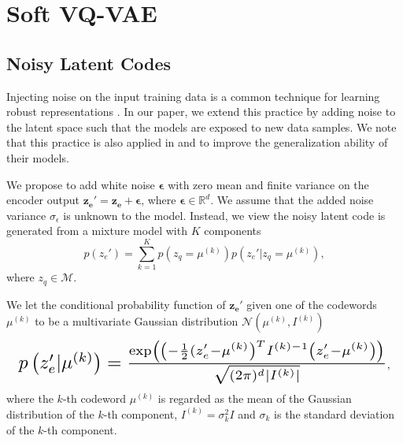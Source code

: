 \documentclass[letterpaper]{article} %
\begin{document}
\section{Soft VQ-VAE}
\label{noise_injection}
\subsection{Noisy Latent Codes}
Injecting noise on the input training data is a common technique for learning robust representations \cite{bengio:AAAI:17}. In our paper, we extend this practice by adding noise to the latent space such  that the models are exposed to new data samples. We note that this practice is also applied in \cite{DBLP:journals/corr/abs-1811-07557} and \cite{pmlr-v32-rezende14} to improve the generalization ability of their models.

We propose to add white noise $\bm{\epsilon}$ with zero mean and finite variance on the encoder output $\mathbf{z_e'} = \mathbf{z_e} + \bm{\epsilon}$, where $\bm{\epsilon} \in \mathbb{R}^d$.  We assume that the added noise variance $\sigma_\epsilon$ is unknown to the model. Instead, we view the noisy latent code is generated from a mixture model with $K$ components
\begin{equation}
\label{eq:gmm_generative}
p(z_e') = \sum_{k = 1}^K p\left(z_q = \mu^{(k)}\right)p\left(z_e'|z_q = \mu^{(k)}\right), 
\end{equation}
where $z_q \in \mathcal{M}$.

We let the conditional probability function of $\mathbf{z_e'}$ given one of the codewords $\mu^{(k)}$ to be a multivariate Gaussian distribution $\mathcal{N}\left(\mu^{(k)}, I^{(k)}\right)$ 
\begin{equation}
\label{eq:componentGaussian}
\resizebox{.97\hsize}{!}
{$p\left(z_e'|\mu^{(k)}\right) = \frac{\exp\left(\left(-\frac{1}{2}(z_e'-\mu^{(k)}\right)^T I^{(k)-1}\left(z_e'-\mu^{(k)}\right)\right)}{\sqrt{(2\pi)^d|I^{(k)}|}}$},
\end{equation}
where the $k$-th codeword $\mu^{(k)}$ is regarded as the mean of the Gaussian distribution of the $k$-th component, $I^{(k)} = \sigma_k^2I$ and $\sigma_k$ is the standard deviation of the $k$-th component.
\end{document}
